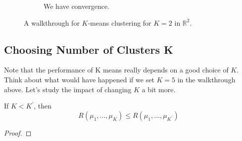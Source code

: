 \begin{example}
\begin{figure}[H]
\begin{subfigure}[b]{0.48\textwidth}
        \caption{We have convergence.}
      \end{subfigure}
      \caption{A walkthrough for $K$-means clustering for $K = 2$ in $\mathbb{R}^2$.}
      \label{fig:kmeans}
    \end{figure}
  \end{example}

\subsection{Choosing Number of Clusters K}

  Note that the performance of K means really depends on a good choice of $K$. Think about what would have happened if we set $K = 5$ in the walkthrough above. Let's study the impact of changing $K$ a bit more. 

  \begin{theorem}
    If $K < K^\prime$, then 
    \begin{equation}
      R(\mu_1, \ldots, \mu_K) \leq R(\mu_1, \ldots, \mu_{K^\prime})
    \end{equation}
  \end{theorem}
  \begin{proof}
    
  \end{proof}



